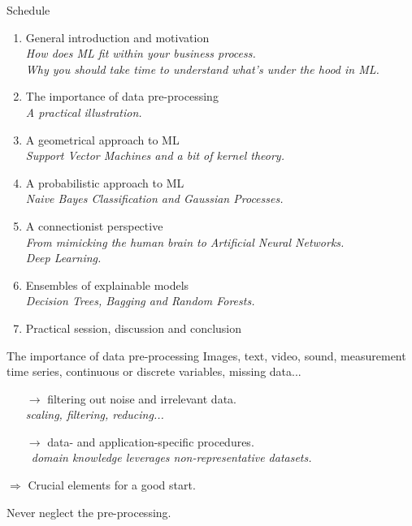 \documentclass{beamer}
\begin{document}
\begin{frame}{Schedule}
\begin{enumerate}
\item General introduction and motivation \Checkmark \\
{\small \it How does ML fit within your business process.\\
Why you should take time to understand what's under the hood in ML.}
\item The importance of data pre-processing\\
{\small \it A practical illustration.}
\item A geometrical approach to ML\\
{\small \it Support Vector Machines and a bit of kernel theory.}
\item A probabilistic approach to ML\\
{\small \it Naive Bayes Classification and Gaussian Processes.}
\item A connectionist perspective \\
{\small \it From mimicking the human brain to Artificial Neural Networks.\\
Deep Learning.}
\item Ensembles of explainable models\\
{\small \it Decision Trees, Bagging and Random Forests.}
\item Practical session, discussion and conclusion
\end{enumerate}
\end{frame}

\begin{frame}{The importance of data pre-processing}
Images, text, video, sound, measurement time series, continuous or discrete variables, missing data...
\begin{itemize}
\item[$\rightarrow$] filtering out noise and irrelevant data.\\
{\small \it scaling, filtering, reducing...}
\item[$\rightarrow$] data- and application-specific procedures.\\
{\small \it domain knowledge leverages non-representative datasets.}
\end{itemize}
$\Rightarrow$ Crucial elements for a good start.
\begin{center}
Never neglect the pre-processing.
\end{center}
\end{frame}
\end{document}
